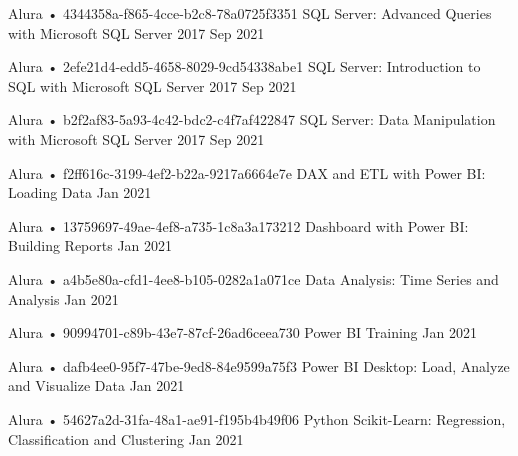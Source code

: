 \begin{cventries}
  \cventry
    {Alura • 4344358a-f865-4cce-b2c8-78a0725f3351} %
    {SQL Server: Advanced Queries with Microsoft SQL Server 2017} %
    {} %
    {Sep 2021} %
    {}

  \cventry
    {Alura • 2efe21d4-edd5-4658-8029-9cd54338abe1} %
    {SQL Server: Introduction to SQL with Microsoft SQL Server 2017} %
    {} %
    {Sep 2021} %
    {}

  \cventry
    {Alura • b2f2af83-5a93-4c42-bdc2-c4f7af422847} %
    {SQL Server: Data Manipulation with Microsoft SQL Server 2017} %
    {} %
    {Sep 2021} %
    {}

  \cventry
    {Alura • f2ff616c-3199-4ef2-b22a-9217a6664e7e} %
    {DAX and ETL with Power BI: Loading Data} %
    {} %
    {Jan 2021} %
    {}

  \cventry
    {Alura • 13759697-49ae-4ef8-a735-1c8a3a173212} %
    {Dashboard with Power BI: Building Reports} %
    {} %
    {Jan 2021} %
    {}

  \cventry
    {Alura • a4b5e80a-cfd1-4ee8-b105-0282a1a071ce} %
    {Data Analysis: Time Series and Analysis} %
    {} %
    {Jan 2021} %
    {}

  \cventry
    {Alura • 90994701-c89b-43e7-87cf-26ad6ceea730} %
    {Power BI Training} %
    {} %
    {Jan 2021} %
    {}

  \cventry
    {Alura • dafb4ee0-95f7-47be-9ed8-84e9599a75f3} %
    {Power BI Desktop: Load, Analyze and Visualize Data} %
    {} %
    {Jan 2021} %
    {}

  \cventry
    {Alura • 54627a2d-31fa-48a1-ae91-f195b4b49f06} %
    {Python Scikit-Learn: Regression, Classification and Clustering} %
    {} %
    {Jan 2021} %
    {}


\end{cventries}
